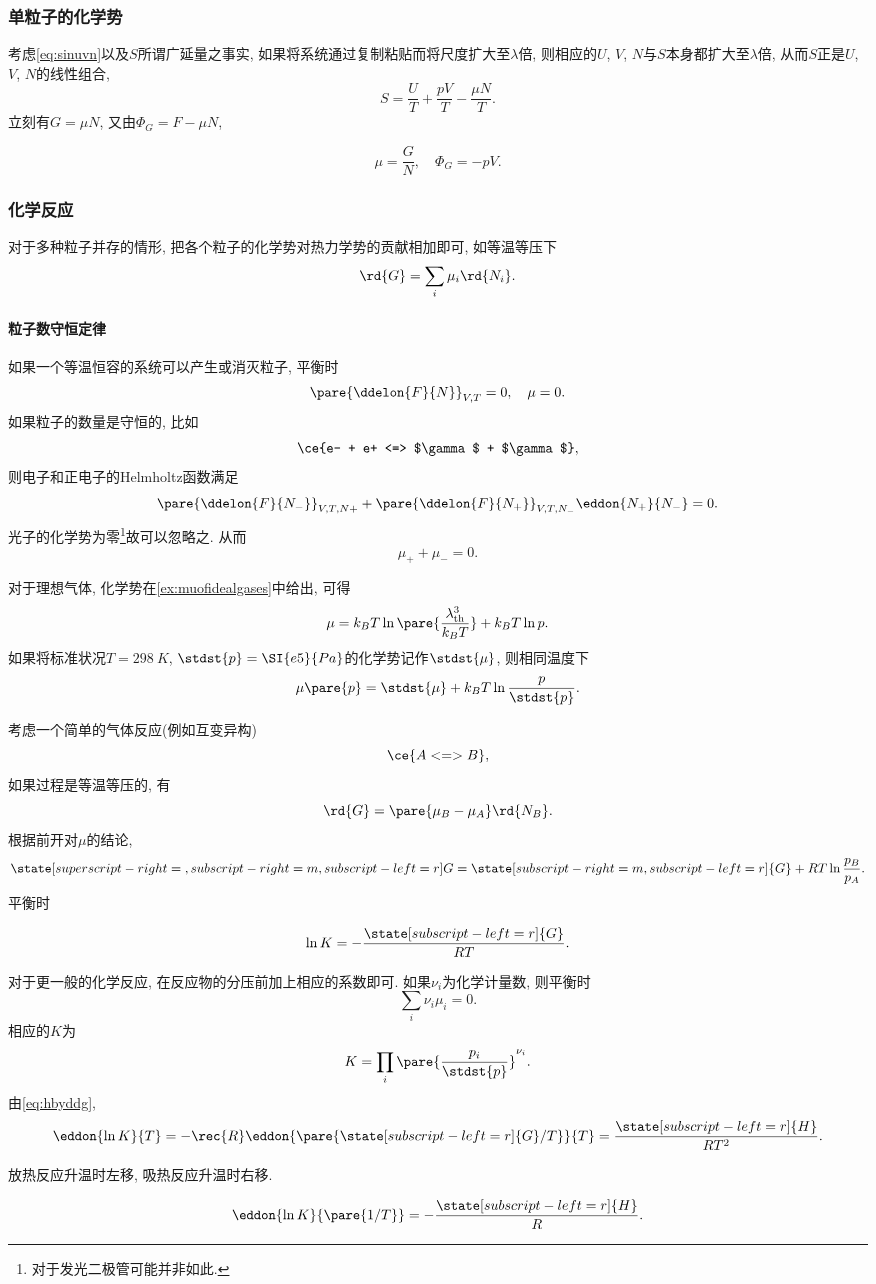 \documentclass[../Thermal.tex]{subfiles}
\begin{document}
\subsubsection{单粒子的化学势}
考虑\eqref{eq:sinuvn}以及$S$所谓广延量之事实, 如果将系统通过复制粘贴而将尺度扩大至$\lambda$倍, 则相应的$U$, $V$, $N$与$S$本身都扩大至$\lambda$倍, 从而$S$正是$U$, $V$, $N$的线性组合,
\[ S = \frac{U}{T} + \frac{pV}{T} - \frac{\mu N}{T}. \]
立刻有$G=\mu N$, 又由$\Phi_G = F - \mu N$,
\begin{finale}
\begin{equation}
\label{eq:muGNandPhiGpV}
\mu = \frac{G}{N},\quad \Phi_G = -pV.
\end{equation}
\end{finale}
\subsubsection{化学反应}
对于多种粒子并存的情形, 把各个粒子的化学势对热力学势的贡献相加即可, 如等温等压下
\[ \rd{G} = \sum_i \mu_i \rd{N_i}. \]
\paragraph{粒子数守恒定律} 如果一个等温恒容的系统可以产生或消灭粒子, 平衡时
\[ \pare{\ddelon{F}{N}}_{V,T} = 0,\quad \mu = 0. \]
如果粒子的数量是守恒的, 比如
\[ \ce{e- + e+ <=> $\gamma$ + $\gamma$}, \]
则电子和正电子的Helmholtz函数满足
\[ \pare{\ddelon{F}{N_-}}_{V,T,N+} + \pare{\ddelon{F}{N_+}}_{V,T,N_-} \eddon{N_+}{N_-} = 0. \]
光子的化学势为零\footnote{对于发光二极管可能并非如此.}故可以忽略之. 从而
\[ \mu_+ + \mu_- = 0. \]
\begin{ex}
对于理想气体, 化学势在\cref{ex:muofidealgases}中给出, 可得
\[ \mu = k_BT\ln\pare{\frac{\lambda_{\mathrm{th}}^3}{k_B T}} + k_B T\ln p. \]
如果将标准状况$T=\SI{298}{K}$, $\stdst{p}=\SI{e5}{Pa}$的化学势记作$\stdst{\mu}$, 则相同温度下
\[ \mu\pare{p} = \stdst{\mu} + k_BT\ln\frac{p}{\stdst{p}}. \]
\end{ex}
考虑一个简单的气体反应(例如互变异构)
\[ \ce{A <=> B}, \]
如果过程是等温等压的, 有
\[ \rd{G} = \pare{\mu_B -\mu_A}\rd{N_B}. \]
根据前开对$\mu$的结论,
\[ \state[superscript-right={},subscript-right=m,subscript-left=r]{G} = \state[subscript-right=m,subscript-left=r]{G} + RT\ln\frac{p_B}{p_A}. \]
平衡时
\begin{finale}
\[ \ln K = -\frac{\state[subscript-left=r]{G}}{RT}. \]
\end{finale}
对于更一般的化学反应, 在反应物的分压前加上相应的系数即可. 如果$\nu_i$为化学计量数, 则平衡时
\[ \sum_i \nu_i \mu_i = 0. \]
相应的$K$为
\[ K = \prod_i \pare{\frac{p_i}{\stdst{p}}}^{\nu_i}. \]
由\eqref{eq:hbyddg},
\[ \eddon{\ln K}{T} = -\rec{R}\eddon{\pare{\state[subscript-left=r]{G}/T}}{T} = \frac{\state[subscript-left=r]{H}}{RT^2}. \]
\begin{corollary}[le Chatelier原理]
放热反应升温时左移, 吸热反应升温时右移.
\end{corollary}
\begin{corollary}
\[ \eddon{\ln K}{\pare{1/T}} = -\frac{\state[subscript-left=r]{H}}{R}. \]
\end{corollary}
\end{document}
